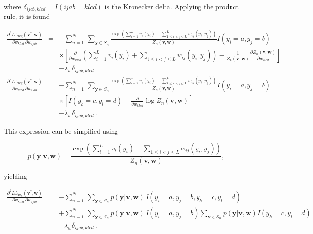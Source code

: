 \documentclass[11pt,a4paper,twoside]{book}
\newcommand{\eq}{\!=\!}
\newcommand{\LLreg}{L\!L_\mathrm{reg}}
\newcommand{\Sn}{S_n}
\renewcommand{\v}{\mathbf{v}}
\newcommand{\w}{\mathbf{w}}
\newcommand{\wijab}{w_{ijab}}
\newcommand{\wklcd}{w_{klcd}}
\theoremstyle{definition}
\theoremstyle{definition}
\theoremstyle{remark}
\begin{document}
where \(\delta_{ijab,klcd} = I(ijab=klcd)\) is the Kronecker delta.
Applying the product rule, it is found

\begin{eqnarray}
    \frac{\partial^2 \LLreg(\v^*,\w)}{\partial \wklcd \, \partial \wijab  } 
    &=&  - \sum_{n=1}^{N} \, \sum_{\mathbf{y} \in \Sn} \frac{\exp \left(\sum_{i=1}^L v_i(y_i) + \sum_{1 \le i < j \le L}^L w_{ij}(y_i,y_j)  \right)}{Z_n(\v,\w)}  I(y_i \eq a, y_j \eq b) \nonumber \\
    && \times  \left[ \frac{\partial}{\partial \wklcd} \left( \sum_{i=1}^L v_i(y_i) + \sum_{1 \le i < j \le L}  w_{ij}(y_i,y_j)  \right) 
                  - \frac{1}{Z_n(\v,\w)} \frac{\partial  Z_n(\v,\w) }{\partial\wklcd} \right] \nonumber\\
    &&- \lambda_w \delta_{ijab,klcd} \\
    \frac{\partial^2 \LLreg(\v^*,\w)}{\partial \wklcd \, \partial \wijab  } 
    &=&  - \sum_{n=1}^{N} \, \sum_{\mathbf{y} \in \Sn} \frac{\exp \left(\sum_{i=1}^L v_i(y_i) + \sum_{1 \le i < j \le L}^L w_{ij}(y_i,y_j)  \right)}{Z_n(\v,\w)}  I(y_i \eq a, y_j \eq b) \nonumber\\
    && \times \left[ I(y_k \eq c, y_l \eq d) - \frac{\partial}{\partial \wklcd} \log Z_n(\v,\w) \right] \nonumber\\
    &&- \lambda_w \delta_{ijab,klcd} \,.
\end{eqnarray}

This expression can be simpified using

\begin{equation}
    p(\mathbf{y} | \v,\w) = \frac{\exp \left( \sum_{i=1}^L v_i(y_i) + \sum_{1 \le i < j \le L} w_{ij}(y_i,y_j) \right)}{Z_n(\v,\w)}  ,
\end{equation}

yielding

\begin{eqnarray}
    \frac{\partial^2 \LLreg(\v^*,\w)}{\partial \wklcd \, \partial \wijab} 
    &=& -  \sum_{n=1}^{N} \, \sum_{\mathbf{y} \in \Sn} p(\mathbf{y} | \v,\w) \, I(y_i \eq a, y_j \eq b, y_k \eq c, y_l \eq d) \nonumber \\
    && + \sum_{n=1}^{N} \, \sum_{\mathbf{y} \in \mathcal{S}_n} p(\mathbf{y} | \v,\w) \, I(y_i \eq a, y_j \eq b ) \sum_{\mathbf{y} \in \Sn} p(\mathbf{y} | \v,\w)  I(y_k \eq c, y_l \eq d ) \nonumber \\
    && - \lambda_w \delta_{ijab,klcd} \,.
\end{eqnarray}
\end{document}
